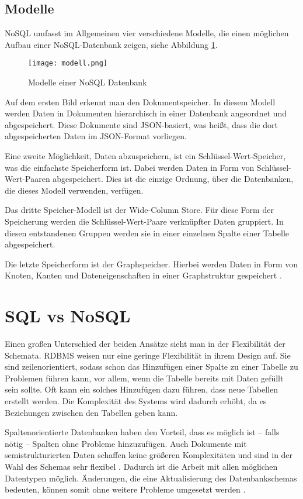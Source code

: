 \subsection{Modelle}

NoSQL umfasst im Allgemeinen vier verschiedene Modelle, die einen möglichen Aufbau einer NoSQL-Datenbank zeigen, siehe Abbildung \ref{img:modell}.

\begin{figure}[!htb]
    \centering
    \texttt{[image: modell.png]}
    \caption{Modelle einer NoSQL Datenbank  \cite{drei}}
    \label{img:modell}
\end{figure}

Auf dem ersten Bild erkennt man den Dokumentspeicher. In diesem Modell werden Daten in Dokumenten hierarchisch in einer Datenbank angeordnet und abgespeichert. Diese Dokumente sind JSON-basiert, was heißt, dass die dort abgespeicherten Daten im JSON-Format vorliegen.

Eine zweite Möglichkeit, Daten abzuspeichern, ist ein Schlüssel-Wert-Speicher, was die einfachste Speicherform ist. Dabei werden Daten in Form von Schlüssel-Wert-Paaren abgespeichert. Dies ist die einzige Ordnung, über die Datenbanken, die dieses Modell verwenden, verfügen.

Das dritte Speicher-Modell ist der Wide-Column Store. Für diese Form der Speicherung werden die Schlüssel-Wert-Paare verknüpfter Daten gruppiert. In diesen entstandenen Gruppen werden sie in einer einzelnen Spalte einer Tabelle abgespeichert.

Die letzte Speicherform ist der Graphspeicher. Hierbei werden Daten in Form von Knoten, Kanten und Dateneigenschaften in einer Graphstruktur gespeichert \cite{drei}.


\section{SQL vs NoSQL}

Einen großen Unterschied der beiden Ansätze sieht man in der Flexibilität der Schemata. RDBMS weisen nur eine geringe Flexibilität in ihrem Design auf. Sie sind zeilenorientiert, sodass schon das Hinzufügen einer Spalte zu einer Tabelle zu Problemen führen kann, vor allem, wenn die Tabelle bereits mit Daten gefüllt sein sollte. Oft kann ein solches Hinzufügen dazu führen, dass neue Tabellen erstellt werden. Die Komplexität des Systems wird dadurch erhöht, da es Beziehungen zwischen den Tabellen geben kann.

Spaltenorientierte Datenbanken haben den Vorteil, dass es möglich ist – falls nötig – Spalten ohne Probleme hinzuzufügen. Auch Dokumente mit semistrukturierten Daten schaffen keine größeren Komplexitäten und sind in der Wahl des Schemas sehr flexibel \cite[S.19]{zwei}. Dadurch ist die Arbeit mit allen möglichen Datentypen möglich. Änderungen, die eine Aktualisierung des Datenbankschemas bedeuten, können somit ohne weitere Probleme umgesetzt werden \cite[S.18]{zwei}. 


